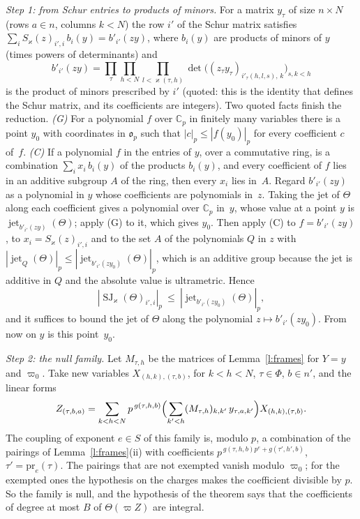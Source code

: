 \documentclass[11pt,a4paper]{article}
\makeatletter
\theoremstyle{plainx}
\theoremstyle{uprightx}
\renewenvironment{proof}[1][Proof]{\par\pushQED{\qed}\normalfont\topsep0pt\partopsep0pt
  \trivlist\item[\hskip\labelsep\itshape #1.]\ignorespaces}{\popQED\endtrivlist\@endpefalse}
\newcommand{\CC}{\mathbb{C}}
\newcommand{\Cp}{\CC_p}
\newcommand{\op}{\mathfrak{o}_p}
\newcommand{\np}[1]{|#1|_p}
\newcommand{\schurjet}[2]{\operatorname{SJ}_{#1}(#2)}
\newcommand{\jetalong}[2]{\operatorname{jet}_{#1}(#2)}
\makeatother
\begin{document}
\begin{proof}[Proof of Theorem E]
\emph{Step 1: from Schur entries to products of minors.} For a matrix $y_\tau$ of size $n\times N$ (rows $a\in n$,
columns $k<N$) the row $i'$ of the Schur matrix satisfies
$\sum_iS_\varkappa(z)_{i',i}\,b_i(y)=b'_{i'}(zy)$, where $b_i(y)$ are products of minors of $y$ (times powers of
determinants) and
\[b'_{i'}(zy)=\prod_{\tau}\prod_{h<N}\prod_{l<\varkappa(\tau,h)}\det\bigl((z_\tau y_\tau)_{i'_\tau(h,l,s),\,k}\bigr)_{s,k<h}\]
is the product of minors prescribed by $i'$ (quoted: this is the identity that defines the Schur matrix, and its
coefficients are integers). Two quoted facts finish the reduction. \emph{(G)} For a polynomial $f$ over $\Cp$ in
finitely many variables there is a point $y_0$ with coordinates in $\op$ such that $\np{c}\le\np{f(y_0)}$ for
every coefficient $c$ of~$f$. \emph{(C)} If a polynomial $f$ in the entries of $y$, over a commutative ring, is
a combination $\sum_ix_i\,b_i(y)$ of the products $b_i(y)$, and every coefficient of $f$ lies in an additive
subgroup $A$ of the ring, then every $x_i$ lies in~$A$. Regard $b'_{i'}(zy)$ as a polynomial in $y$ whose
coefficients are polynomials in~$z$. Taking the jet of $\Theta$ along each coefficient gives a polynomial over
$\Cp$ in~$y$, whose value at a point $y$ is $\jetalong{b'_{i'}(zy)}{\Theta}$; apply (G) to it, which gives $y_0$.
Then apply (C) to $f=b'_{i'}(zy)$, to $x_i=S_\varkappa(z)_{i',i}$ and to the set $A$ of the polynomials $Q$ in $z$
with $\np{\jetalong{Q}{\Theta}}\le\np{\jetalong{b'_{i'}(zy_0)}{\Theta}}$, which is an additive group because the
jet is additive in $Q$ and the absolute value is ultrametric. Hence
\[\np{\schurjet{\varkappa}{\Theta}_{i',i}}\ \le\ \np{\jetalong{b'_{i'}(zy_0)}{\Theta}} ,\]
and it suffices to bound the jet of $\Theta$ along the polynomial $z\mapsto b'_{i'}(zy_0)$. From now on $y$ is this
point~$y_0$.

\emph{Step 2: the null family.} Let $M_{\tau,h}$ be the matrices of Lemma~\ref{l:frames} for $Y=y$ and $\varpi_0$. Take
new variables $X_{(h,k),(\tau,b)}$, for $k<h<N$, $\tau\in\Phi$, $b\in n'$, and the linear forms
\[Z_{(\tau,b,a)}=\sum_{k<h<N}p^{\,g(\tau,h,b)}\Bigl(\sum_{k'<h}(M_{\tau,h})_{k,k'}\,y_{\tau,a,k'}\Bigr)X_{(h,k),(\tau,b)} .\]
The coupling of exponent $e\in S$ of this family is, modulo $p$, a combination of the pairings of
Lemma~\ref{l:frames}(ii) with coefficients $p^{\,g(\tau,h,b)p^e+g(\tau',h',b)}$, $\tau'=\mathrm{pr}_e(\tau)$. The pairings that are not exempted
vanish modulo $\varpi_0$; for the exempted ones the hypothesis on the charges makes the coefficient divisible by $p$.
So the family is null, and the hypothesis of the theorem says that the coefficients of degree at most $B$ of
$\Theta(\varpi Z)$ are integral.


\end{proof}
\end{document}

